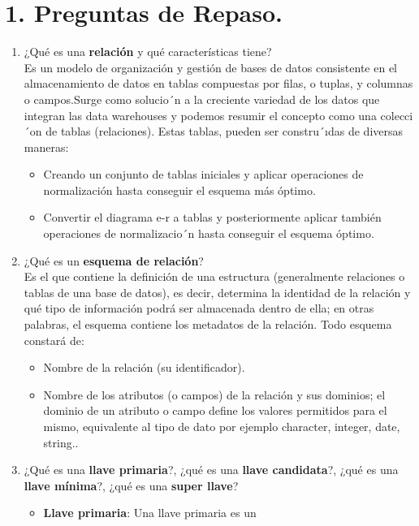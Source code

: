 \documentclass[a4paper, 12pt]{report}
\begin{document}
\section*{1. Preguntas de Repaso.}{
	\begin{enumerate}[label=(\alph*)]
		\item  ¿Qué es una \textbf{relación} y qué características 	
		tiene?\\
		Es un modelo de organización y gestión de bases de datos 				consistente en el almacenamiento de datos en tablas compuestas 		por filas, o tuplas, y columnas o campos.Surge como solucio´n a 		la creciente variedad de los datos que integran las data 				warehouses y podemos resumir el concepto como una colecci´on 	
		de tablas (relaciones). Estas tablas, pueden ser constru´ıdas 	
		de diversas maneras:
		\begin{itemize}
			\item Creando un conjunto de tablas iniciales y aplicar 				operaciones de normalización hasta conseguir el esquema 				más óptimo.
			\item Convertir el diagrama e-r a tablas y posteriormente 	
			aplicar también operaciones de normalizacio´n hasta 	
			conseguir el esquema óptimo.
		\end{itemize}		 
		\item  ¿Qué es un \textbf{esquema de relación}?\\
		Es el que contiene la definición de una estructura 	
		(generalmente relaciones o tablas de una base de datos), es 	
		decir, determina la identidad de la relación y qué tipo de 	
		información podrá ser almacenada dentro de ella; en otras 	
		palabras, el esquema contiene los metadatos de la relación. 	
		Todo esquema constará de:
		\begin{itemize}
			\item Nombre de la relación (su identificador).
			\item Nombre de los atributos (o campos) de la relación y 				sus dominios; el dominio de un atributo o campo define los 	
			valores permitidos para el mismo, equivalente al tipo de 	
			dato por ejemplo character, integer, date, string..
		\end{itemize}
		\item  ¿Qué es una \textbf{llave primaria}?, ¿qué es una 		
		\textbf{llave candidata}?, ¿qué es una \textbf{llave mínima}?, 		¿qué es una \textbf{super llave}?
		\begin{itemize}
			\item \textbf{Llave primaria}: Una llave primaria es un 	

\end{itemize}
\end{enumerate}}
\end{document}
